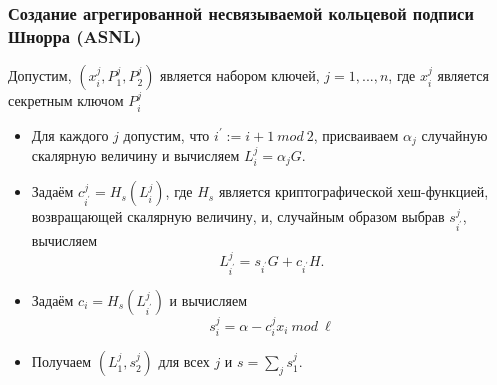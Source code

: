 \documentclass{mrl}
\theoremstyle{definition}
\numberwithin{thm}{section}
\begin{document}
\subsubsection{Создание агрегированной несвязываемой кольцевой подписи Шнорра (ASNL)}
Допустим, $(x_i^j, P_1^j, P_2^j)$ является набором ключей, $j=1,...,n$, где $x_i^j$ является секретным ключом $P_i^j$
\begin{itemize}
 \item Для каждого $j$ допустим, что $i^\prime := i+1\ mod\ 2$, присваиваем $\alpha_j$ случайную скалярную величину и вычисляем $L_i^j = \alpha_j G$.
 \item Задаём $c_{i^\prime}^j= H_s(L_i^j)$, где $H_s$ является криптографической хеш-функцией, возвращающей скалярную величину, и, случайным образом выбрав $s_{i^\prime}^j$, вычисляем
 \[
L_{i^\prime}^j = s_{i^\prime} G + c_{i^\prime} H.
 \]
 \item Задаём $c_i = H_s(L_{i^\prime}^j)$ и вычисляем
 \[
s_i^j = \alpha - c_i^j x_i \ mod\ \ell
 \]
 \item Получаем $(L_1^j, s_2^j)$ для всех $j$ и $s = \sum_j s_1^j$.
\end{itemize}
\end{document}
